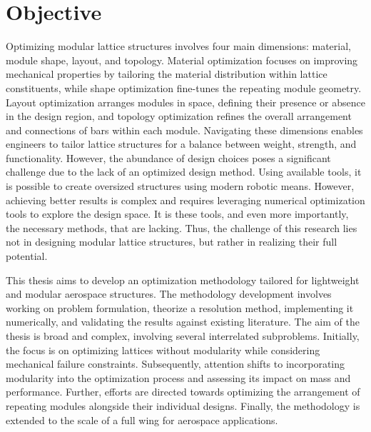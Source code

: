 \section*{Objective}
Optimizing modular lattice structures involves four main dimensions: material, module shape, layout, and topology. Material optimization focuses on improving mechanical properties by tailoring the material distribution within lattice constituents, while shape optimization fine-tunes the repeating module geometry. Layout optimization arranges modules in space, defining their presence or absence in the design region, and topology optimization refines the overall arrangement and connections of bars within each module. Navigating these dimensions enables engineers to tailor lattice structures for a balance between weight, strength, and functionality. However, the abundance of design choices poses a significant challenge due to the lack of an optimized design method. Using available tools, it is possible to create oversized structures using modern robotic means. However, achieving better results is complex and requires leveraging numerical optimization tools to explore the design space. It is these tools, and even more importantly, the necessary methods, that are lacking. Thus, the challenge of this research lies not in designing modular lattice structures, but rather in realizing their full potential.

This thesis aims to develop an optimization methodology tailored for lightweight and modular aerospace structures. The methodology development involves working on problem formulation, theorize a resolution method, implementing it numerically, and validating the results against existing literature. The aim of the thesis is broad and complex, involving several interrelated subproblems. Initially, the focus is on optimizing lattices without modularity while considering mechanical failure constraints. Subsequently, attention shifts to incorporating modularity into the optimization process and assessing its impact on mass and performance. Further, efforts are directed towards optimizing the arrangement of repeating modules alongside their individual designs. Finally, the methodology is extended to the scale of a full wing for aerospace applications.


